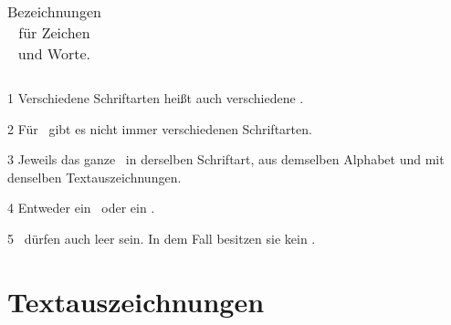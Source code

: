 \begin{table}[h]
\begin{center}
\begin{threeparttable}
\begin{tabularx}{14,17cm}{|p{}|p{}|p{}|p{}|p{}|p{}|}
				\hline
			\end{tabularx}
			\begin{tablenotes}
				\footnotesize
				\item[1] Verschiedene Schriftarten heißt auch verschiedene \Textbuchstaben.
				\item[2] Für \typographischeSymbole\ gibt es nicht immer verschiedenen Schriftarten.
				\item[3] Jeweils das ganze \Textwort\ in derselben Schriftart, aus demselben Alphabet und mit denselben Textauszeichnungen.
				\item[4] Entweder ein \Textwort\ oder ein \typographischesSymbol.
				\item[5] \Zeichenketten\ dürfen auch leer sein. In dem Fall besitzen sie kein \Kettenglied.
			\end{tablenotes}
			\caption{Bezeichnungen für Zeichen und Worte.}
			\label{tab:Bezeichnungen}%
		\end{threeparttable}
	\end{center}
\end{table}

\section     {Textauszeichnungen}%
\label   {sec:Textauszeichnungen}

